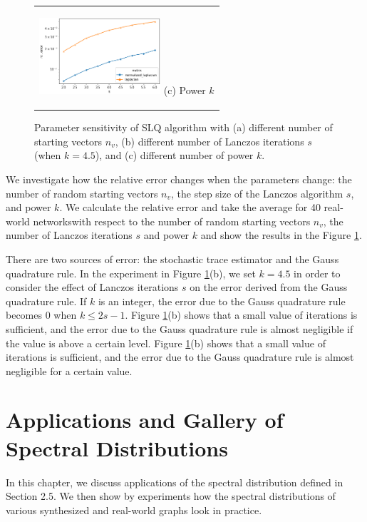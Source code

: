 \documentclass[senior,final,11pt]{iscs-thesis}
\begin{document}
\begin{figure}[htbp]
\begin{center}
\begin{tabular}{c}
        \begin{minipage}{0.33\hsize}
          \begin{center}
            \includegraphics[clip, width=4.5cm]{./figure/plot_param_k.png}
            \hspace{1.6cm} (c) Power $k$
          \end{center}
        \end{minipage}

      \end{tabular}
      \caption{Parameter sensitivity of SLQ algorithm with (a) different number of starting vectors $n_v$, (b) different number of Lanczos iterations $s$ (when $k=4.5$), and (c) different number of power $k$. }
      \label{fig:param_sensitivity}
    \end{center}
  \end{figure}

We investigate how the relative error changes when the parameters change: the number of random starting vectors $n_v$, the step size of the Lanczos algorithm $s$, and power $k$. We calculate the relative error and take the average for 40 real-world networkswith respect to the number of random starting vectors $n_v$, the number of Lanczos iterations $s$ and power $k$ and show the results in the Figure \ref{fig:param_sensitivity}.

There are two sources of error: the stochastic trace estimator and the Gauss quadrature rule. In the experiment in Figure \ref{fig:param_sensitivity}(b), we set $k=4.5$ in order to consider the effect of Lanczos iterations $s$ on the error derived from the Gauss quadrature rule. If $k$ is an integer, the error due to the Gauss quadrature rule becomes 0 when $k \leq 2s-1$. Figure \ref{fig:param_sensitivity}(b) shows that a small value of iterations is sufficient, and the error due to the Gauss quadrature rule is almost negligible if the value is above a certain level. Figure \ref{fig:param_sensitivity}(b) shows that a small value of iterations is sufficient, and the error due to the Gauss quadrature rule is almost negligible for a certain value.


\chapter{Applications and Gallery of Spectral Distributions}
In this chapter, we discuss applications of the spectral distribution defined in Section 2.5. We then show by experiments how the spectral distributions of various synthesized and real-world graphs look in practice.
\end{document}
